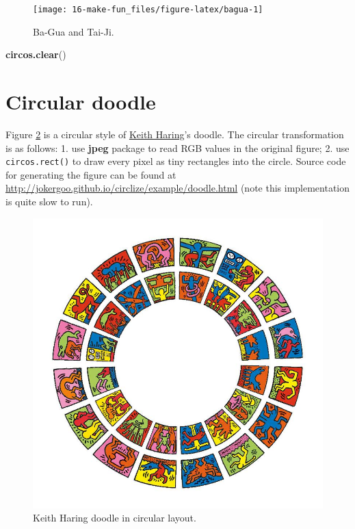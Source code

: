 \documentclass[]{book}
\newenvironment{Shaded}{\begin{snugshade}}{\end{snugshade}}
\newcommand{\KeywordTok}[1]{\textcolor[rgb]{0.13,0.29,0.53}{\textbf{#1}}}
\newcommand{\NormalTok}[1]{#1}
\theoremstyle{definition}
\theoremstyle{definition}
\theoremstyle{remark}
\begin{document}
\begin{figure}

{\centering \texttt{[image: 16-make-fun\_files/figure-latex/bagua-1]} 

}

\caption{Ba-Gua and Tai-Ji.}\label{fig:bagua}
\end{figure}

\begin{Shaded}
\begin{Highlighting}[]
\KeywordTok{circos.clear}\NormalTok{()}
\end{Highlighting}
\end{Shaded}

\section{Circular doodle}\label{circular-doodle}

Figure \ref{fig:doodle} is a circular style of
\href{https://en.wikipedia.org/wiki/Keith_Haring}{Keith Haring}'s
doodle. The circular transformation is as follows: 1. use \textbf{jpeg}
package to read RGB values in the original figure; 2. use
\texttt{circos.rect()} to draw every pixel as tiny rectangles into the
circle. Source code for generating the figure can be found at
\url{http://jokergoo.github.io/circlize/example/doodle.html} (note this
implementation is quite slow to run).

\begin{figure}

{\centering \includegraphics[width=11.11in]{images/doodle} 

}

\caption{Keith Haring doodle in circular layout.}\label{fig:doodle}
\end{figure}


\end{document}
